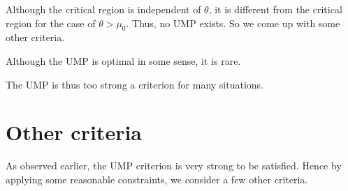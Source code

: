 \documentclass[a4paper,english,12pt]{article}
\begin{document}
\begin{rem}
Although the critical region is independent of $\theta$, it is different from the critical region for the case of $\theta > \mu_0$. Thus, no UMP exists. So we come up with some other criteria.
\end{rem}
\begin{rem}
Although the UMP is optimal in some sense, it is rare.
\end{rem}
\begin{rem}
The UMP is thus too strong a criterion for many situations.
\end{rem}
\section*{Other criteria}
As observed earlier, the UMP criterion is very strong to be satisfied. Hence by applying some reasonable constraints, we consider a few other criteria.
\end{document}
